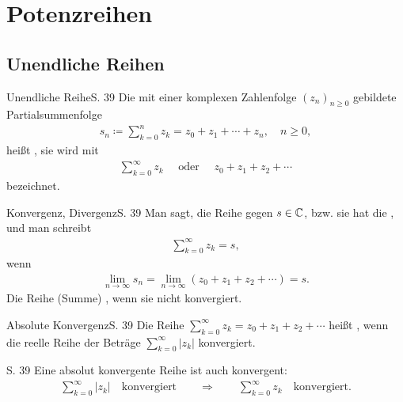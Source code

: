 \section{Potenzreihen}

\subsection{Unendliche Reihen}

\begin{bemerkung}{Unendliche Reihe}{S. 39}
  Die mit einer komplexen Zahlenfolge $(z_n)_{n \geq 0}$ gebildete Partialsummenfolge
  \begin{align}
    s_n \coloneqq \sum_{k=0}^n z_k = z_0 + z_1 + \cdots + z_n, \quad n \geq 0 ,
  \end{align}
  heißt , sie wird mit
  \begin{align}
    \sum_{k=0}^\infty z_k \quad \text{ oder } \quad z_0 + z_1 + z_2 + \cdots
  \end{align}
  bezeichnet.
\end{bemerkung}

\begin{bemerkung}{Konvergenz, Divergenz}{S. 39}
  Man sagt, die Reihe  gegen $s \in \mathbb{C}$, bzw. sie hat die , und man schreibt
  \begin{align}
    \sum_{k=0}^\infty z_k = s ,
  \end{align}
  wenn
  \begin{align}
    \lim_{n \to \infty} s_n = \lim_{n \to \infty} (z_0 + z_1 + z_2 + \cdots) = s .
  \end{align}
  Die Reihe (\glqq Summe\grqq) , wenn sie nicht konvergiert.
\end{bemerkung}

\begin{bemerkung}{Absolute Konvergenz}{S. 39}
  Die Reihe $\displaystyle \sum_{k=0}^\infty z_k = z_0 + z_1 + z_2 + \cdots$ heißt , wenn die reelle Reihe der Beträge $\displaystyle \sum_{k=0}^\infty |z_k|$ konvergiert.
\end{bemerkung}

\begin{satz}{S. 39}
  Eine absolut konvergente Reihe ist auch konvergent:
  \begin{align}
    \sum_{k=0}^\infty |z_k| \quad \text{konvergiert} \qquad \Rightarrow \qquad \sum_{k=0}^\infty z_k \quad \text{konvergiert.}
  \end{align}
\end{satz}

